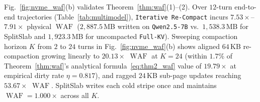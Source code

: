 \documentclass[10pt,journal,compsoc]{IEEEtran}
\theoremstyle{definition}
\theoremstyle{remark}
\newcommand{\SplitSlab}{\textup{\textsc{SplitSlab}}}
\newcommand{\WAF}{\operatorname{WAF}}
\def\SplitSlab{SplitSlab}%
\begin{document}
\begin{table}[!t]
\centering
\caption{Measured Apple M5 Pro $64$\,KB I/O vs.\ Analytical Datacenter $3$-Stripe ($192$\,KB) Overlap ($1{,}160\,\mu\mathrm{s}$ Conservative GPU Window)}
\label{tab:storage_tiers}
\renewcommand{\arraystretch}{1.10}
\setlength{\tabcolsep}{3.0pt}
\end{table}

Fig.~\ref{fig:nvme_waf}(b) validates Theorem~\ref{thm:waf}(1)--(2). Over $12$-turn end-to-end trajectories (Table~\ref{tab:multimodel}), \texttt{Iterative Re-Compact} incurs $7.53\times$--$7.91\times$ physical $\WAF$ ($2{,}887.5$\,MB written on \texttt{Qwen2.5-7B} vs.\ $1{,}538.3$\,MB for \SplitSlab{} and $1{,}923.3$\,MB for uncompacted \texttt{Full-KV}). Sweeping compaction horizon $K$ from $2$ to $24$ turns in Fig.~\ref{fig:nvme_waf}(b) shows aligned $64$\,KB re-compaction growing linearly to $20.13\times$ $\WAF$ at $K=24$ (within $1.7\%$ of Theorem~\ref{thm:waf}'s analytical formula~\eqref{eq:thm2_waf} value of $19.79\times$ at empirical dirty rate $\eta = 0.817$), and ragged $24$\,KB sub-page updates reaching $53.67\times$ $\WAF$. \SplitSlab{} writes each cold stripe once and maintains $\WAF = 1.000\times$ across all $K$.
\end{document}
